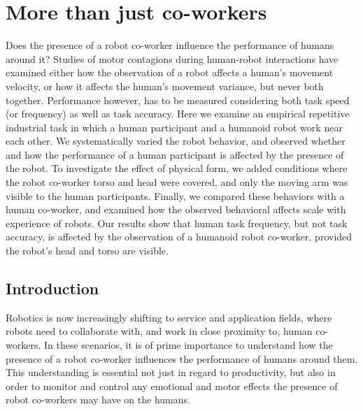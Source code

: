 \documentclass[a4paper, 12pt, oneside]{Thesis}  %
\begin{document}

\chapter{More than just co-workers}

Does the presence of a robot co-worker influence the performance of humans around it? Studies of motor contagions during human-robot interactions have examined either how the observation of a robot affects a human's movement velocity, or how it affects the human's movement variance, but never both together. Performance however, has to be measured considering both task speed (or frequency) as well as task accuracy. Here we examine an empirical repetitive industrial task in which a human participant and a humanoid robot work near each other. We systematically varied the robot behavior, and observed whether and how the performance of a human participant is affected by the presence of the robot. To investigate the effect of physical form, we added conditions where the robot co-worker torso and head were covered, and only the moving arm was visible to the human participants. Finally, we compared these behaviors with a human co-worker, and examined how the observed behavioral affects scale with experience of robots. Our results show that human task frequency, but not task accuracy, is affected by the observation of a humanoid robot co-worker, provided the robot's head and torso are visible.

\clearpage
\section{Introduction}
Robotics is now increasingly shifting to service and application fields, where robots need to collaborate with, and work in close proximity to, human co-workers. In these scenarios, it is of prime importance to understand how the presence of a robot co-worker influences the performance of humans around them. This understanding is essential not just in regard to productivity, but also in order to monitor and control any emotional and motor effects the presence of robot co-workers may have on the humans.
\end{document}
